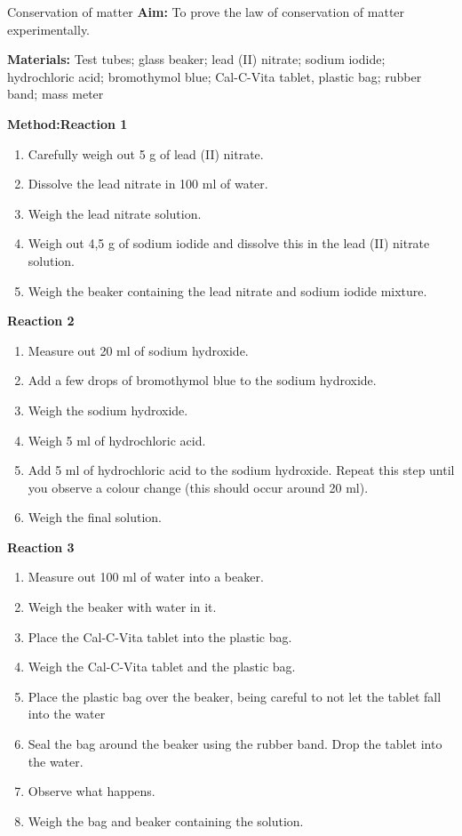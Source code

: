 \label{m38711*eip-14}
            \begin{g_experiment}{Conservation of matter}
            \nopagebreak
            \label{m38711*eip-453}\noindent{}\textbf{Aim:}
To prove the law of conservation of matter experimentally.
\par 
\label{m38711*eip792}\noindent{}\textbf{Materials:}
Test tubes; glass beaker; lead (II) nitrate; sodium iodide; hydrochloric acid; bromothymol blue; Cal-C-Vita tablet, plastic bag; rubber band; mass meter 
\par 
\label{m38711*eip-153}
	\par
      \label{m38711*id72432}\noindent{}\textbf{Method:}\textbf{Reaction 1}
\label{m38711*id6342}\begin{enumerate}[noitemsep, label=\textbf{\arabic*}. ] 
            \item Carefully weigh out 5 g of lead (II) nitrate.\item Dissolve the lead nitrate in 100 ml of water. \item Weigh the lead nitrate solution.\item Weigh out 4,5 g of sodium iodide and dissolve this in the lead (II) nitrate solution.\item Weigh the beaker containing the lead nitrate and sodium iodide mixture.\end{enumerate}
\textbf{Reaction 2}
\label{m38711*id63452}\begin{enumerate}[noitemsep, label=\textbf{\arabic*}. ] 
            \item Measure out 20 ml of sodium hydroxide.\item Add a few drops of bromothymol blue to the sodium hydroxide.\item Weigh the sodium hydroxide.\item Weigh 5 ml of hydrochloric acid.\item Add 5 ml of hydrochloric acid to the sodium hydroxide. Repeat this step until you observe a colour change (this should occur around 20 ml).\item Weigh the final solution.\end{enumerate}
\textbf{Reaction 3}
\label{m38711*id634223}\begin{enumerate}[noitemsep, label=\textbf{\arabic*}. ] 
            \item Measure out 100 ml of water into a beaker.\item Weigh the beaker with water in it.\item Place the Cal-C-Vita tablet into the plastic bag.\item Weigh the Cal-C-Vita tablet and the plastic bag.\item Place the plastic bag over the beaker, being careful to not let the tablet fall into the water\item Seal the bag around the beaker using the rubber band. Drop the tablet into the water.\item Observe what happens.\item Weigh the bag and beaker containing the solution.\end{enumerate}

\end{g_experiment}
